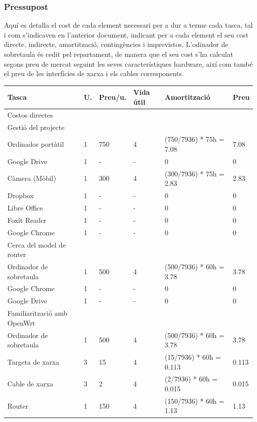 \documentclass[11pt]{article}
\begin{document}
\subsubsection{Pressupost}
Aquí es detalla el cost de cada element necessari per a dur a terme cada tasca, tal i com s’indicaven en l’anterior document, indicant per a cada element el seu cost directe, indirecte, amortització, contingències i imprevistos. L’odinador de sobretaula és cedit pel repartament, de manera que el seu cost s’ha calculat segons preu de mercat seguint les seves característiques hardware, així com també el preu de les interfícies de xarxa i els cables corresponents.
\begin{center}
	\begin{tabular}{| l | l | l | l | l | l |}
		\hline
		Tasca & U. & Preu/u. & Vida útil & Amortització & Preu \\ \hline
		Costos directes & & & & & \\ \hline
		Gestió del projecte & & & & & \\ \hline
		Ordinador portàtil & 1 & 750 & 4 & (750/7936) * 75h = 7.08 & 7.08 \\ \hline
		Google Drive & 1 & - & - & 0 & 0 \\ \hline
		Càmera (Mòbil) & 1 & 300 & 4 & (300/7936) * 75h = 2.83 & 2.83 \\ \hline
		Dropbox & 1 & - & - & 0 & 0 \\ \hline
		Libre Office & 1 & - & - & 0 & 0 \\ \hline
		Foxit Reader & 1 & - & - & 0 & 0 \\ \hline
		Google Chrome & 1 & - & - & 0 & 0 \\ \hline
		Cerca del model de router & & & & & \\ \hline
		Ordinador de sobretaula & 1 & 500 & 4 & (500/7936) * 60h = 3.78 & 3.78 \\ \hline
		Google Chrome & 1 & - & - & 0 & 0 \\ \hline
		Google Drive & 1 & - & - & 0 & 0 \\ \hline
		Familiarització amb OpenWrt & & & & & \\ \hline
		Ordinador de sobretaula & 1 & 500 & 4 & (500/7936) * 60h = 3.78 & 3.78 \\ \hline
		Targeta de xarxa & 3 & 15 & 4 & (15/7936) * 60h = 0.113 & 0.113 \\ \hline
		Cable de xarxa & 3 & 2 & 4 & (2/7936) * 60h = 0.015 & 0.015 \\ \hline
		Router & 1 & 150 & 4 & (150/7936) * 60h = 1.13 & 1.13 \\ \hline

\end{tabular}
\end{center}
\end{document}
